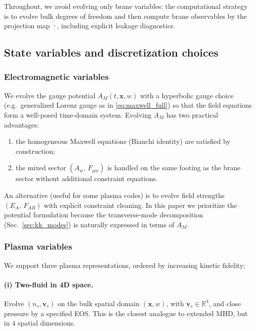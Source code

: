 \documentclass[11pt]{article}
\newcommand{\R}{\mathbb{R}}
\newcommand{\x}{\mathbf{x}}     %
\newcommand{\A}{A}              %
\newcommand{\Proj}[1]{\overline{#1}} %
\begin{document}
Throughout, we avoid evolving only brane variables: the computational strategy is
to evolve bulk degrees of freedom and then compute brane observables by the
projection map \(\Proj{\cdot}\), including explicit leakage diagnostics.

\subsection{State variables and discretization choices}
\label{sec:state_vars}

\subsubsection*{Electromagnetic variables}

We evolve the gauge potential \(\A_M(t,\x,w)\) with a hyperbolic gauge choice
(e.g.\ generalized Lorenz gauge as in \eqref{eq:maxwell_full}) so that the field
equations form a well-posed time-domain system. Evolving \(\A_M\) has two practical
advantages:
\begin{enumerate}[leftmargin=1.6em]
\item the homogeneous Maxwell equations (Bianchi identity) are satisfied by
construction;
\item the mixed sector \((A_w,\,F_{\mu w})\) is handled on the same footing as the
brane sector without additional constraint equations.
\end{enumerate}
An alternative (useful for some plasma codes) is to evolve field strengths
\((E_A,\,F_{AB})\) with explicit constraint cleaning. In this paper we prioritize
the potential formulation because the transverse-mode decomposition (Sec.~\ref{sec:kk_modes})
is naturally expressed in terms of \(\A_M\).

\subsubsection*{Plasma variables}

We support three plasma representations, ordered by increasing kinetic fidelity:

\paragraph{(i) Two-fluid in 4D space.}
Evolve \((n_s,\mathbf{v}_s)\) on the bulk spatial domain \((\x,w)\), with
\(\mathbf{v}_s\in\R^4\), and close pressure by a specified EOS. This is the
closest analogue to extended MHD, but in \(4\) spatial dimensions.
\end{document}
